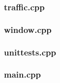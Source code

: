 \documentclass{article}
\begin{document}
    \subsubsection{traffic.cpp}
      
    \subsubsection{window.cpp}
      
    \subsubsection{unittests.cpp}
      
    \subsubsection{main.cpp}
      
\end{document}
